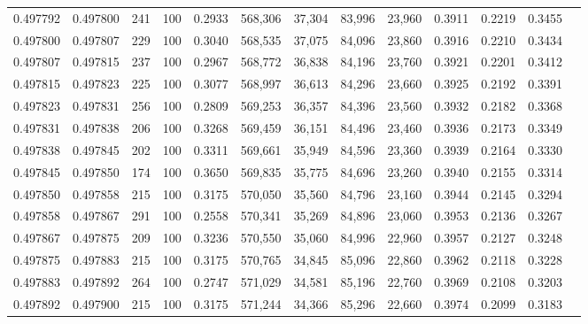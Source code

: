 \begin{tabular}{rrrrrrrrrrrrr}
0.497792 & 0.497800 &   241 & 100 &                                     0.2933 & 568,306 &  37,304 &  83,996 &  23,960 & 0.3911 & 0.2219 & 0.3455 \\
0.497800 & 0.497807 &   229 & 100 &                                     0.3040 & 568,535 &  37,075 &  84,096 &  23,860 & 0.3916 & 0.2210 & 0.3434 \\
0.497807 & 0.497815 &   237 & 100 &                                     0.2967 & 568,772 &  36,838 &  84,196 &  23,760 & 0.3921 & 0.2201 & 0.3412 \\
0.497815 & 0.497823 &   225 & 100 &                                     0.3077 & 568,997 &  36,613 &  84,296 &  23,660 & 0.3925 & 0.2192 & 0.3391 \\
0.497823 & 0.497831 &   256 & 100 &                                     0.2809 & 569,253 &  36,357 &  84,396 &  23,560 & 0.3932 & 0.2182 & 0.3368 \\
0.497831 & 0.497838 &   206 & 100 &                                     0.3268 & 569,459 &  36,151 &  84,496 &  23,460 & 0.3936 & 0.2173 & 0.3349 \\
0.497838 & 0.497845 &   202 & 100 &                                     0.3311 & 569,661 &  35,949 &  84,596 &  23,360 & 0.3939 & 0.2164 & 0.3330 \\
0.497845 & 0.497850 &   174 & 100 &                                     0.3650 & 569,835 &  35,775 &  84,696 &  23,260 & 0.3940 & 0.2155 & 0.3314 \\
0.497850 & 0.497858 &   215 & 100 &                                     0.3175 & 570,050 &  35,560 &  84,796 &  23,160 & 0.3944 & 0.2145 & 0.3294 \\
0.497858 & 0.497867 &   291 & 100 &                                     0.2558 & 570,341 &  35,269 &  84,896 &  23,060 & 0.3953 & 0.2136 & 0.3267 \\
0.497867 & 0.497875 &   209 & 100 &                                     0.3236 & 570,550 &  35,060 &  84,996 &  22,960 & 0.3957 & 0.2127 & 0.3248 \\
0.497875 & 0.497883 &   215 & 100 &                                     0.3175 & 570,765 &  34,845 &  85,096 &  22,860 & 0.3962 & 0.2118 & 0.3228 \\
0.497883 & 0.497892 &   264 & 100 &                                     0.2747 & 571,029 &  34,581 &  85,196 &  22,760 & 0.3969 & 0.2108 & 0.3203 \\
0.497892 & 0.497900 &   215 & 100 &                                     0.3175 & 571,244 &  34,366 &  85,296 &  22,660 & 0.3974 & 0.2099 & 0.3183 \\

\end{tabular}
